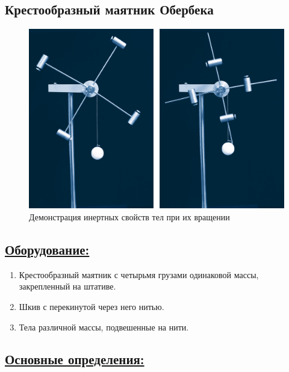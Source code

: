 \documentclass[14pt,a4paper,oneside]{extarticle}	%
\begin{document}
	
	\begin{center}
		\subsection*{Крестообразный маятник Обербека}
	\end{center}
	
	\begin{figure}[H] 	
		\centering 	
		\includegraphics[width=0.9\linewidth]{oberbeck-1.png}
		\caption{Демонстрация инертных свойств тел при их вращении}
		\label{oberbeck-1}
	\end{figure}
	
	\subsection*{\underline{Оборудование:}}
	
	\begin{enumerate} 
		\item Крестообразный маятник с четырьмя грузами одинаковой массы, закрепленный на штативе.
		\item Шкив с перекинутой через него нитью.
		\item Тела различной массы, подвешенные на нити.
	\end{enumerate}

	\newpage
	\subsection*{\underline{Основные определения:}}
	
\end{document}

